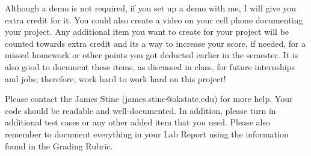 \documentclass{article}
\begin{document}
Although a demo is not required, if you set up a demo with me, I will
give you extra credit for it.  You could also create a video on your
cell phone documenting your project.  Any additional item you want to
create for your project will be counted towards extra credit and its a
way to increase your score, if needed, for a missed homework or other
points you got deducted earlier in the semester.  It is also good to
document these items, as discussed in class, for future internships
and jobs; therefore, work  hard to work hard on this project!

Please contact
the James Stine
(james.stine@okstate.edu) 
for more help.  Your
code should be
readable and well-documented. In addition, please turn in additional
test cases or any other added item that you used. 
Please also remember to document everything in your Lab Report using
the information found in the Grading Rubric.

   


\end{document}
